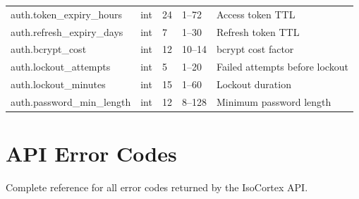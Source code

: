 \documentclass[11pt,a4paper]{article}
\begin{document}
\begin{longtable}{@{}p{4cm}p{1.5cm}p{2cm}p{2cm}p{4.5cm}@{}}
\midrule
auth.token\_expiry\_hours & int & 24 & 1--72 & Access token TTL \\
auth.refresh\_expiry\_days & int & 7 & 1--30 & Refresh token TTL \\
auth.bcrypt\_cost & int & 12 & 10--14 & bcrypt cost factor \\
auth.lockout\_attempts & int & 5 & 1--20 & Failed attempts before lockout \\
auth.lockout\_minutes & int & 15 & 1--60 & Lockout duration \\
auth.password\_min\_length & int & 12 & 8--128 & Minimum password length \\
\bottomrule
\end{longtable}

\newpage
\section{API Error Codes}

Complete reference for all error codes returned by the IsoCortex API.
\end{document}

